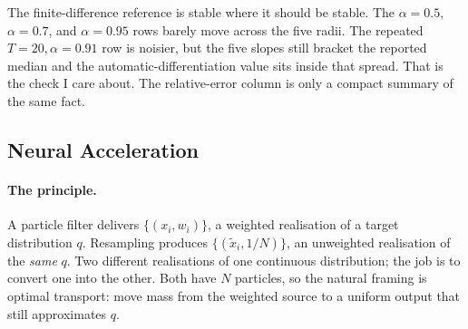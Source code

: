 \documentclass{article}
\begin{document}
\begin{table}[H]
\centering
\scriptsize
\caption{SV1D LEDH+OT gradient validation cases. The finite-difference slopes use radii $1,\ldots,5$ times the base step $10^{-4}$; the finite-difference median is the median of those five slopes.}
\label{tab:gradient_validation_sv1d}
\end{table}

The finite-difference reference is stable where it should be stable. The $\alpha=0.5$, $\alpha=0.7$, and $\alpha=0.95$ rows barely move across the five radii. The repeated $T=20,\alpha=0.91$ row is noisier, but the five slopes still bracket the reported median and the automatic-differentiation value sits inside that spread. That is the check I care about. The relative-error column is only a compact summary of the same fact.


\subsection{Neural Acceleration}

\paragraph{The principle.}
A particle filter delivers $\{(x_i, w_i)\}$, a weighted realisation of a target distribution $q$. Resampling produces $\{(\tilde x_i, 1/N)\}$, an unweighted realisation of the \emph{same} $q$. Two different realisations of one continuous distribution; the job is to convert one into the other. Both have $N$ particles, so the natural framing is optimal transport: move mass from the weighted source to a uniform output that still approximates $q$.
\end{document}
